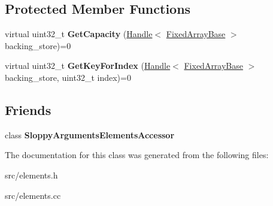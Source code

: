 \subsection*{Protected Member Functions}
\begin{DoxyCompactItemize}
\item 
\hypertarget{classv8_1_1internal_1_1_elements_accessor_a91cf975ac8fde13c6ebc17b3d3765804}{}virtual uint32\+\_\+t {\bfseries Get\+Capacity} (\hyperlink{classv8_1_1internal_1_1_handle}{Handle}$<$ \hyperlink{classv8_1_1internal_1_1_fixed_array_base}{Fixed\+Array\+Base} $>$ backing\+\_\+store)=0\label{classv8_1_1internal_1_1_elements_accessor_a91cf975ac8fde13c6ebc17b3d3765804}

\item 
\hypertarget{classv8_1_1internal_1_1_elements_accessor_ac038d2421a6eb120ac2c9c05e54e6061}{}virtual uint32\+\_\+t {\bfseries Get\+Key\+For\+Index} (\hyperlink{classv8_1_1internal_1_1_handle}{Handle}$<$ \hyperlink{classv8_1_1internal_1_1_fixed_array_base}{Fixed\+Array\+Base} $>$ backing\+\_\+store, uint32\+\_\+t index)=0\label{classv8_1_1internal_1_1_elements_accessor_ac038d2421a6eb120ac2c9c05e54e6061}

\end{DoxyCompactItemize}
\subsection*{Friends}
\begin{DoxyCompactItemize}
\item 
\hypertarget{classv8_1_1internal_1_1_elements_accessor_a9bed0841dc26dd4da2ab63034744726f}{}class {\bfseries Sloppy\+Arguments\+Elements\+Accessor}\label{classv8_1_1internal_1_1_elements_accessor_a9bed0841dc26dd4da2ab63034744726f}

\end{DoxyCompactItemize}


The documentation for this class was generated from the following files\+:\begin{DoxyCompactItemize}
\item 
src/elements.\+h\item 
src/elements.\+cc\end{DoxyCompactItemize}
